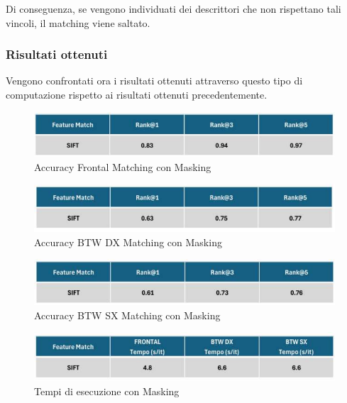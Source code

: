 \documentclass[12pt,a4paper,openright,twoside]{book}
\begin{document}
Di conseguenza, se vengono individuati dei descrittori che non rispettano tali vincoli, il matching viene saltato.

\subsubsection{Risultati ottenuti}
Vengono confrontati ora i risultati ottenuti attraverso questo tipo di computazione rispetto ai risultati ottenuti precedentemente.
\begin{figure}[H]
	\centering
	\includegraphics{figures/frontal2.pdf}
    	\caption{Accuracy Frontal Matching con Masking}
	\label{fig:frontal2}
\end{figure}
\begin{figure}[H]
	\centering
	\includegraphics{figures/dx2.pdf}
    	\caption{Accuracy BTW DX Matching con Masking}
	\label{fig:dx2}
\end{figure}
\begin{figure}[H]
	\centering
	\includegraphics{figures/sx2.pdf}
    	\caption{Accuracy BTW SX Matching con Masking}
	\label{fig:sx2}
\end{figure}
\begin{figure}[H]
	\centering
	\includegraphics{figures/tempi2.pdf}
   	\caption{Tempi di esecuzione con Masking}
	\label{fig:tempi2}
\end{figure}
\end{document}

